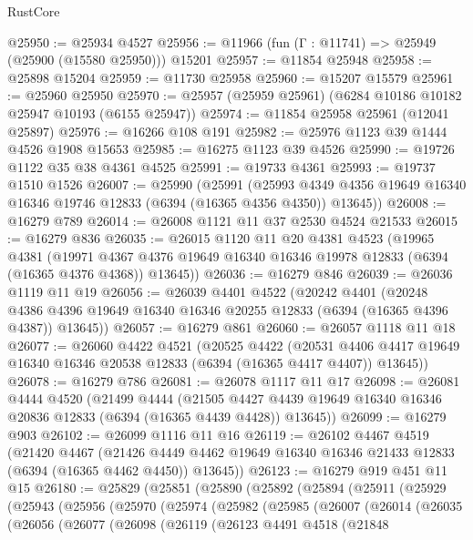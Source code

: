 \begin{lexlean}{RustCore}
\begin{coremodule}
@25950 := @25934 @4527
@25956 := @11966 (fun (Γ : @11741) => @25949 (@25900 (@15580 @25950))) @15201
@25957 := @11854 @25948
@25958 := @25898 @15204
@25959 := @11730 @25958
@25960 := @15207 @15579
@25961 := @25960 @25950
@25970 := @25957 (@25959 @25961) (@6284 @10186 @10182 @25947 @10193 (@6155 @25947))
@25974 := @11854 @25958 @25961 (@12041 @25897)
@25976 := @16266 @108 @191
@25982 := @25976 @1123 @39 @1444 @4526 @1908 @15653
@25985 := @16275 @1123 @39 @4526
@25990 := @19726 @1122 @35 @38 @4361 @4525
@25991 := @19733 @4361
@25993 := @19737 @1510 @1526
@26007 := @25990
    (@25991
      (@25993 @4349 @4356 @19649 @16340 @16346 @19746 @12833 (@6394 (@16365 @4356 @4350)) @13645))
@26008 := @16279 @789
@26014 := @26008 @1121 @11 @37 @2530 @4524 @21533
@26015 := @16279 @836
@26035 := @26015
    @1120
    @11
    @20
    @4381
    @4523
    (@19965
      @4381
      (@19971 @4367 @4376 @19649 @16340 @16346 @19978 @12833 (@6394 (@16365 @4376 @4368)) @13645))
@26036 := @16279 @846
@26039 := @26036 @1119 @11 @19
@26056 := @26039
    @4401
    @4522
    (@20242
      @4401
      (@20248 @4386 @4396 @19649 @16340 @16346 @20255 @12833 (@6394 (@16365 @4396 @4387)) @13645))
@26057 := @16279 @861
@26060 := @26057 @1118 @11 @18
@26077 := @26060
    @4422
    @4521
    (@20525
      @4422
      (@20531 @4406 @4417 @19649 @16340 @16346 @20538 @12833 (@6394 (@16365 @4417 @4407)) @13645))
@26078 := @16279 @786
@26081 := @26078 @1117 @11 @17
@26098 := @26081
    @4444
    @4520
    (@21499
      @4444
      (@21505 @4427 @4439 @19649 @16340 @16346 @20836 @12833 (@6394 (@16365 @4439 @4428)) @13645))
@26099 := @16279 @903
@26102 := @26099 @1116 @11 @16
@26119 := @26102
    @4467
    @4519
    (@21420
      @4467
      (@21426 @4449 @4462 @19649 @16340 @16346 @21433 @12833 (@6394 (@16365 @4462 @4450)) @13645))
@26123 := @16279 @919 @451 @11 @15
@26180 := @25829
    (@25851
      (@25890
        (@25892
          (@25894
            (@25911
              (@25929
                (@25943
                  (@25956
                    (@25970
                      (@25974
                        (@25982
                          (@25985
                            (@26007
                              (@26014
                                (@26035
                                  (@26056
                                    (@26077
                                      (@26098
                                        (@26119
                                          (@26123
                                            @4491
                                            @4518
                                            (@21848

\end{coremodule}
\end{lexlean}
